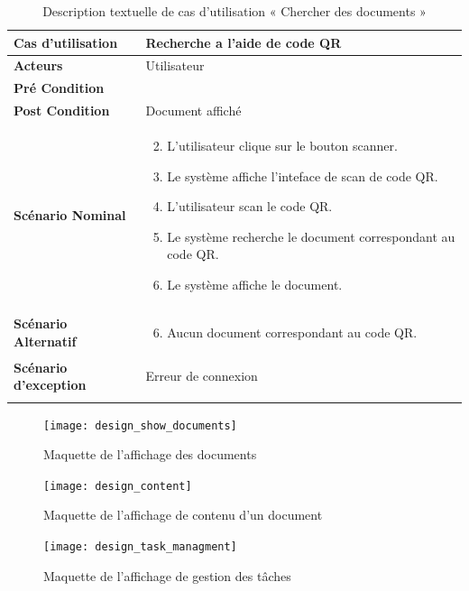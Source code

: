 \begin{longtable}{|p{5cm}|p{10cm}|}
\hline
\textbf{Cas d'utilisation}&Recherche a l'aide de code QR\\
\hline
\textbf{Acteurs}&Utilisateur\\
\hline
\textbf{Pré Condition}&\\
\hline
\textbf{Post Condition}&Document affiché\\
\hline
\textbf{Scénario Nominal}&
\vspace{-\baselineskip}
\begin{enumerate}
    \setcounter{enumi}{1}
    \item L'utilisateur clique sur le bouton scanner.
    \item Le système affiche l'inteface de scan de code QR.
    \item L'utilisateur scan le code QR.
    \item Le système recherche le document correspondant au code QR.
    \item Le système affiche le document.
\end{enumerate}\\
\hline
\textbf{Scénario Alternatif}&
\vspace{-\baselineskip}
\begin{enumerate}
    \setcounter{enumi}{5}
    \item Aucun document correspondant au code QR.
\end{enumerate}\\
\hline
\textbf{Scénario d'exception}&Erreur de connexion\\
\hline
\caption{Description textuelle de cas d'utilisation « Chercher des documents »}
\label{tab:DescriptionTextuelleDeCasDUtilisationChercherDesDocumentsQR}
\end{longtable}

\begin{figure}[H]
  \centering
  \texttt{[image: design\_show\_documents]}
  \caption{Maquette de l'affichage des documents}
  \label{fig:design_show_documents}
\end{figure}

\begin{figure}[H]
  \centering
  \texttt{[image: design\_content]}
  \caption{Maquette de l'affichage de contenu d'un document}
  \label{fig:design_show_document}
\end{figure}

\begin{figure}[H]
  \centering
  \texttt{[image: design\_task\_managment]}
  \caption{Maquette de l'affichage de gestion des tâches}
  \label{fig:design_manage_tasks}
\end{figure}

